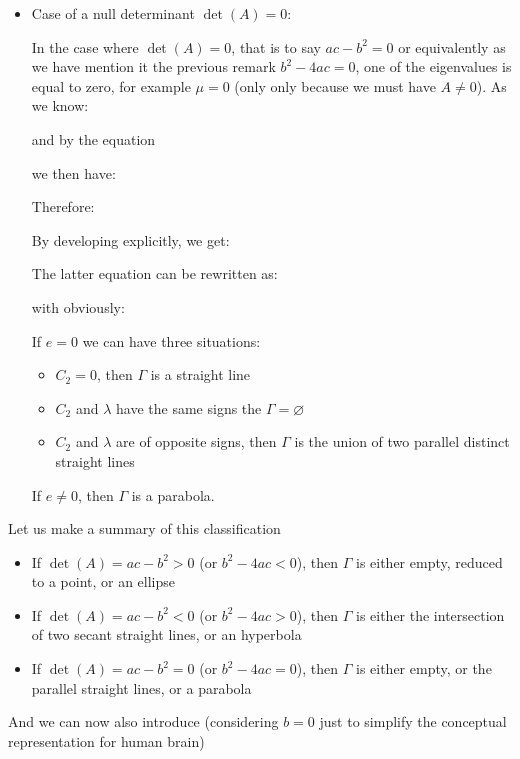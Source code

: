 \begin{itemize}
		\item Case of a null determinant $\det(A)=0$:
		
		In the case where $\det(A)=0$, that is to say $ac-b^2=0$ or equivalently as we have mention it the previous remark $b^2-4ac=0$, one of the eigenvalues is equal to zero, for example $\mu=0$ (only only because we must have $A\neq 0$). As we know:
		
		and by the equation
		
		we then have:
		
		Therefore:
		
		By developing explicitly, we get:
		
		The latter equation can be rewritten as:
		
		with obviously:
		
		If $e=0$ we can have three situations:
		\begin{itemize}
			\item $C_2=0$, then $\Gamma$ is a straight line

			\item $C_2$ and $\lambda$ have the same signs the $\Gamma=\varnothing$

			\item $C_2$ and $\lambda$ are of opposite signs, then $\Gamma$ is the union of two parallel distinct straight lines
		\end{itemize}
		If $e\neq 0$, then $\Gamma$ is a parabola.
	\end{itemize}
	Let us make a summary of this classification\label{type of conics determinant}
	\begin{itemize}
		\item If $\det(A)=ac-b^2>0$ (or $b^2-4ac<0$), then $\Gamma$ is either empty, reduced to a point, or an ellipse

		\item If $\det(A)=ac-b^2<0$ (or $b^2-4ac>0$), then $\Gamma$ is either the intersection of two secant straight lines, or an hyperbola

			\item If $\det(A)=ac-b^2=0$ (or $b^2-4ac=0$), then $\Gamma$ is either empty, or the parallel straight lines, or a parabola
	\end{itemize}
	And we can now also introduce (considering $b=0$ just to simplify the conceptual representation for human brain)\label{type of conics matrix approach}
